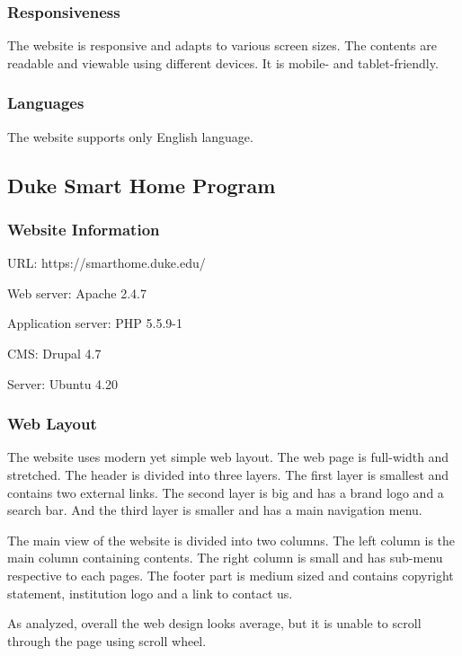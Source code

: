 \subsubsection*{Responsiveness}
The website is responsive and adapts to various screen sizes. The contents are readable and viewable using different devices. It is mobile- and tablet-friendly.

\subsubsection*{Languages}
The website supports only English language.

\subsection{Duke Smart Home Program}
\subsubsection*{Website Information}
\begin{itemize*}
\item URL: https://smarthome.duke.edu/
\item Web server: Apache 2.4.7
\item Application server: PHP 5.5.9-1
\item CMS: Drupal 4.7
\item Server: Ubuntu 4.20
\end{itemize*}

\subsubsection*{Web Layout}
The website \cite{JimGaston.2007} uses modern yet simple web layout. The web page is full-width and stretched. The header is divided into three layers. The first layer is smallest and contains two external links. The second layer is big and has a brand logo and a search bar. And the third layer is smaller and has a main navigation menu.

The main view of the website is divided into two columns. The left column is the main column containing contents. The right column is small and has sub-menu respective to each pages. The footer part is medium sized and contains copyright statement, institution logo and a link to contact us.

As analyzed, overall the web design looks average, but it is unable to scroll through the page using scroll wheel.

